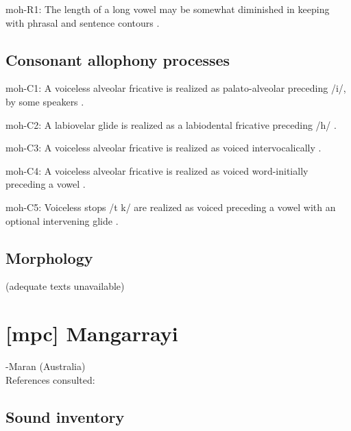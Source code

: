 {\begin{appendixdesc}
\item[moh-R1:] The length of a long vowel may be somewhat diminished in keeping with phrasal and sentence contours \citep[46]{Bonvillain1973}.
\end{appendixdesc}
\subsection*{Consonant allophony processes}
\begin{appendixdesc}

\item[moh-C1:] A voiceless alveolar fricative is realized as palato-alveolar preceding /i/, by some speakers \citep[31]{Bonvillain1973}.

\item[moh-C2:] A labiovelar glide is realized as a labiodental fricative preceding /h/ \citep[34]{Bonvillain1973}.

\item[moh-C3:] A voiceless alveolar fricative is realized as voiced intervocalically \citep{Bonvillain1973}.

\item[moh-C4:] A voiceless alveolar fricative is realized as voiced word-initially preceding a vowel \citep{Bonvillain1973}.

\item[moh-C5:] Voiceless stops /t k/ are realized as voiced preceding a vowel with an optional intervening glide \citep[28]{Bonvillain1973}.
\end{appendixdesc}
\subsection*{Morphology}

(adequate texts unavailable)

\newpage\section*{[mpc] Mangarrayi} %
-Maran (Australia)\medskip\\
References consulted: \citet{Merlan1989}

\subsection*{Sound inventory}
\begin{appendixdesc}


\end{appendixdesc}}
